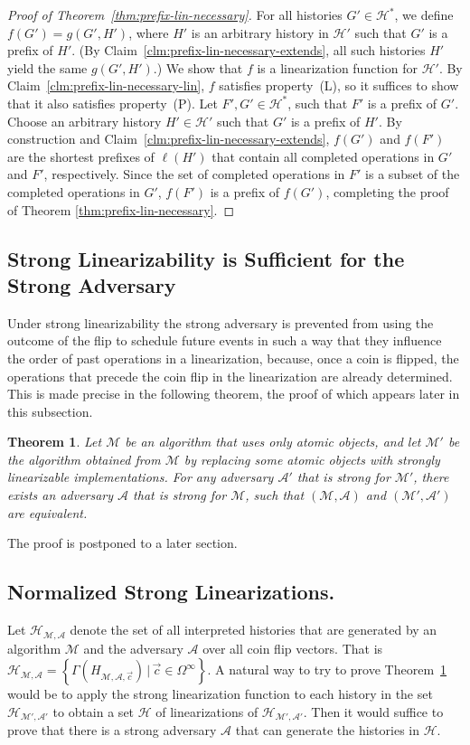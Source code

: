 \documentclass[11pt,letterpaper]{article}
\newtheorem{theorem}{Theorem}[section]
\renewcommand{\AA}{\mathcal{A}}
\newcommand{\HH}{\mathcal{H}}
\newcommand{\MM}{\mathcal{M}}
\newcommand{\vc}{{\vec{c}}}
\begin{document}
\begin{proof}[Proof of Theorem~\ref{thm:prefix-lin-necessary}]
For all histories $G'\in\HH^\ast$, we define $f(G')=g(G',H')$, where $H'$ is an arbitrary history in $\HH'$ such that $G'$ is a prefix of $H'$.
(By Claim~\ref{clm:prefix-lin-necessary-extends}, all such histories $H'$ yield the same $g(G',H')$.)
We show that $f$ is a linearization function for $\HH'$.
By Claim~\ref{clm:prefix-lin-necessary-lin}, $f$ satisfies property~(L), so it suffices to show that it also satisfies property~(P).
Let $F',G'\in\HH^\ast$, such that $F'$ is a  prefix of $G'$.
Choose an arbitrary history $H'\in\HH'$ such that $G'$ is a prefix of $H'$.
By construction and Claim~\ref{clm:prefix-lin-necessary-extends}, $f(G')$ and $f(F')$ are the shortest prefixes of $\ell(H')$ that contain all completed operations in $G'$ and $F'$, respectively.
Since the set of completed operations in $F'$ is a subset of the completed operations in $G'$, $f(F')$ is a prefix of $f(G')$,
completing the proof of Theorem \ref{thm:prefix-lin-necessary}.
\end{proof}

\subsection{Strong Linearizability is Sufficient for the Strong Adversary}
Under strong linearizability the strong adversary is prevented from using the outcome of the flip
to schedule future events in such a way that they influence the order of past operations in a linearization,
because, once a coin is flipped, the operations that precede the coin flip in the linearization are already determined.
This is made precise in the following theorem, the proof of which appears later in this subsection.

\begin{theorem}\label{thm:prefix-lin->equivalence}
  Let $\MM$ be an algorithm that uses only atomic objects,
  and let $\MM'$ be the algorithm obtained from $\MM$ by replacing some atomic objects with strongly linearizable implementations.
  For any adversary $\AA'$ that is strong for $\MM'$, there exists an adversary $\AA$ that is strong for $\MM$,
  such that $(\MM,\AA)$ and $(\MM',\AA')$ are equivalent.
\end{theorem}
The proof is postponed to a later section.

\subsection{Normalized Strong Linearizations.}
Let $\HH_{\MM, \AA}$ denote the set of all interpreted histories
that are generated by an algorithm $\MM$ and the adversary $\AA$ over all coin flip vectors.
That is
$\HH_{\MM, \AA} = \left\{\Gamma(H_{\MM,\AA,\vc})\,|\,\vc\in\Omega^\infty\right\}$.
A natural way to try to prove Theorem~\ref{thm:prefix-lin->equivalence} would be
to apply the strong linearization function to each history in the set $\HH_{\MM', \AA'}$
to obtain a set $\HH$ of linearizations of $\HH_{\MM',\AA'}$.
Then it would suffice to prove that there is a strong adversary $\AA$ that can generate the histories in $\HH$.
\end{document}
